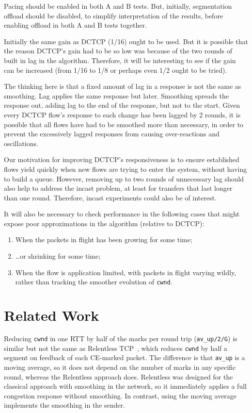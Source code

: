 Pacing should be enabled in both A and B tests. But, initially, segmentation
offload should be disabled, to simplify interpretation of the results, before
enabling offload in both A and B tests together.

Initially the same gain as DCTCP (1/16) ought to be used. But it is possible
that the reason DCTCP's gain had to be so low was because of the two rounds of
built in lag in the algorithm. Therefore, it will be interesting to see if the
gain can be increased (from 1/16 to 1/8 or perhaps even 1/2 ought to be tried).

The thinking here is that a fixed amount of lag in a response is not the same as
smoothing. Lag applies the same response but later. Smoothing spreads the
response out, adding lag to the end of the response, but not to the start. Given
every DCTCP flow's response to each change has been lagged by 2 rounds, it is
possible that all flows have had to be smoothed more than necessary, in order to
prevent the excessively lagged responses from causing over-reactions and
oscillations.

Our motivation for improving DCTCP's responsiveness is to ensure established
flows yield quickly when new flows are trying to enter the system, without
having to build a queue. However, removing up to two rounds of unnecessary lag
should also help to address the incast problem, at least for transfers that last
longer than one round. Therefore, incast experiments could also be of interest.

It will also be necessary to check performance in the following cases that might
expose poor approximations in the algorithm (relative to DCTCP):
\begin{enumerate}
	\item When the packets in flight has been growing for some time;
	\item \ldots{}or shrinking for some time;
	\item When the flow is application limited, with packets in flight varying
	wildly, rather than tracking the smoother evolution of \texttt{cwnd}.
\end{enumerate}


\section{Related Work}\label{prresp_related}
\balance
Reducing \texttt{cwnd} in one RTT by half of the marks per round trip
(\texttt{av\_up/2/G}) is similar but not the same as Relentless
TCP~\cite{Mathis09:Relentless}, which reduces \texttt{cwnd} by half a segment on
feedback of each CE-marked packet. The difference is that \texttt{av\_up} is a
moving average, so it does not depend on the number of marks in any specific
round, whereas the Relentless approach does. Relentless was designed for the
classical approach with smoothing in the network, so it immediately applies a
full congestion response without smoothing. In contrast, using the moving
average implements the smoothing in the sender.


